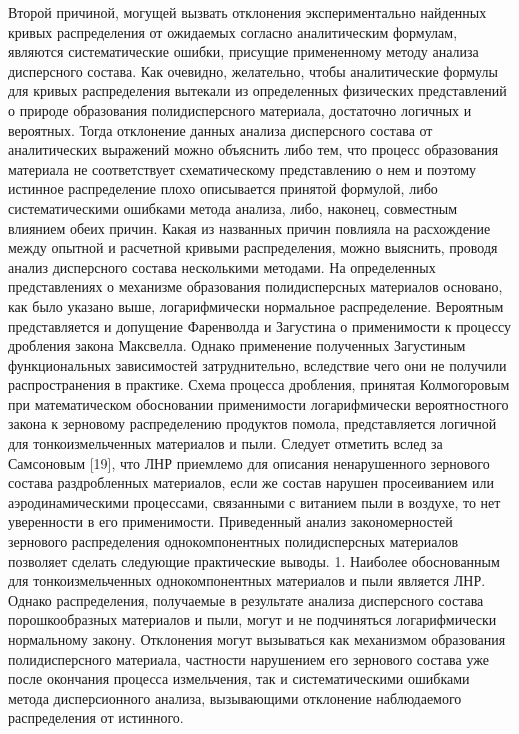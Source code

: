 Второй причиной, могущей вызвать отклонения экспериментально найденных кривых распределения от ожидаемых согласно аналитическим формулам, являются систематические ошибки, присущие примененному методу анализа дисперсного состава. Как очевидно, желательно, чтобы аналитические формулы для кривых распределения вытекали из определенных физических представлений о природе образования полидисперсного материала, достаточно логичных и вероятных. Тогда отклонение данных анализа дисперсного состава от аналитических выражений можно объяснить либо тем, что процесс образования материала не соответствует схематическому представлению о нем и поэтому истинное распределение плохо описывается принятой формулой, либо систематическими ошибками метода анализа, либо, наконец, совместным влиянием обеих причин. Какая из названных причин повлияла на расхождение между опытной и расчетной кривыми распределения, можно выяснить, проводя анализ дисперсного состава несколькими методами.
На определенных представлениях о механизме образования полидисперсных материалов основано, как было указано выше, логарифмически нормальное распределение. 
Вероятным представляется и допущение Фаренволда и Загустина о применимости к процессу дробления закона Максвелла. Однако применение полученных Загустиным функциональных зависимостей затруднительно, вследствие чего они не получили распространения в практике. 
Схема процесса дробления, принятая Колмогоровым при математическом обосновании применимости логарифмически вероятностного закона к зерновому распределению продуктов помола, представляется логичной для тонкоизмельченных материалов и пыли. 
Следует отметить вслед за Самсоновым [19], что ЛНР приемлемо для описания ненарушенного зернового состава раздробленных материалов, если же состав нарушен просеиванием или аэродинамическими процессами, связанными с витанием пыли в воздухе, то нет уверенности в его применимости. 
Приведенный анализ закономерностей зернового распределения однокомпонентных полидисперсных материалов позволяет сделать следующие практические выводы. 
1. Наиболее обоснованным для тонкоизмельченных однокомпонентных материалов и пыли является ЛНР. Однако распределения, получаемые в результате анализа дисперсного состава порошкообразных материалов и пыли, могут и не подчиняться логарифмически нормальному закону. Отклонения могут вызываться как механизмом образования полидисперсного материала, частности нарушением его зернового состава уже после окончания процесса измельчения, так и систематическими ошибками метода дисперсионного анализа, вызывающими отклонение наблюдаемого распределения от истинного. 

